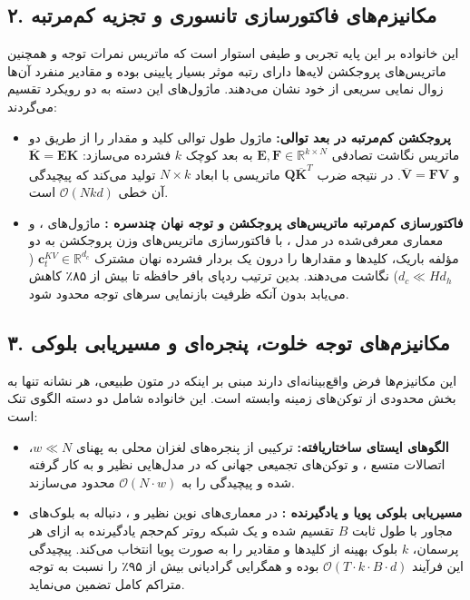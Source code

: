 \documentclass[12pt,a4paper]{report}
\theoremstyle{definition}
\begin{document}
\subsection{۲. مکانیزم‌های فاکتورسازی تانسوری و تجزیه کم‌مرتبه }
این خانواده بر این پایه تجربی و طیفی استوار است که ماتریس نمرات توجه و همچنین ماتریس‌های پروجکشن لایه‌ها دارای رتبه موثر بسیار پایینی بوده و مقادیر منفرد آن‌ها زوال نمایی  سریعی از خود نشان می‌دهند. ماژول‌های این دسته به دو رویکرد تقسیم می‌گردند:
\begin{itemize}
    \item \textbf{پروجکشن کم‌مرتبه در بعد توالی:} ماژول  طول توالی کلید و مقدار را از طریق دو ماتریس نگاشت تصادفی $\mathbf{E}, \mathbf{F} \in \mathbb{R}^{k \times N}$ به بعد کوچک $k$ فشرده می‌سازد: $\overline{\mathbf{K}} = \mathbf{E}\mathbf{K}$ و $\overline{\mathbf{V}} = \mathbf{F}\mathbf{V}$. در نتیجه ضرب $\mathbf{Q}\overline{\mathbf{K}}^T$ ماتریسی با ابعاد $N \times k$ تولید می‌کند که پیچیدگی آن خطی $\mathcal{O}(N k d)$ است.
    \item \textbf{فاکتورسازی کم‌مرتبه ماتریس‌های پروجکشن و توجه نهان چندسره :} ماژول‌های ،  و معماری  معرفی‌شده در مدل ، با فاکتورسازی ماتریس‌های وزن پروجکشن به دو مؤلفه باریک، کلیدها و مقدارها را درون یک بردار فشرده نهان مشترک $\mathbf{c}_t^{KV} \in \mathbb{R}^{d_c}$ ($d_c \ll H d_h$) نگاشت می‌دهند. بدین ترتیب ردپای بافر حافظه  تا بیش از ۸۵٪ کاهش می‌یابد بدون آنکه ظرفیت بازنمایی سرهای توجه محدود شود.
\end{itemize}

\subsection{۳. مکانیزم‌های توجه خلوت، پنجره‌ای و مسیریابی بلوکی }
این مکانیزم‌ها فرض واقع‌بینانه‌ای دارند مبنی بر اینکه در متون طبیعی، هر نشانه تنها به بخش محدودی از توکن‌های زمینه وابسته است. این خانواده شامل دو دسته الگوی تنک است:
\begin{itemize}
    \item \textbf{الگوهای ایستای ساختاریافته:} ترکیبی از پنجره‌های لغزان محلی  به پهنای $w \ll N$، اتصالات متسع ، و توکن‌های تجمیعی جهانی  که در مدل‌هایی نظیر  و  به کار گرفته شده و پیچیدگی را به $\mathcal{O}(N \cdot w)$ محدود می‌سازند.
    \item \textbf{مسیریابی بلوکی پویا و یادگیرنده :} در معماری‌های نوین نظیر  و ، دنباله به بلوک‌های مجاور با طول ثابت $B$ تقسیم شده و یک شبکه روتر کم‌حجم یادگیرنده به ازای هر پرسمان، $k$ بلوک بهینه از کلیدها و مقادیر را به صورت پویا انتخاب می‌کند. پیچیدگی این فرآیند $\mathcal{O}(T \cdot k \cdot B \cdot d)$ بوده و همگرایی گرادیانی بیش از ۹۵٪ را نسبت به توجه متراکم کامل تضمین می‌نماید.
\end{itemize}
\end{document}
